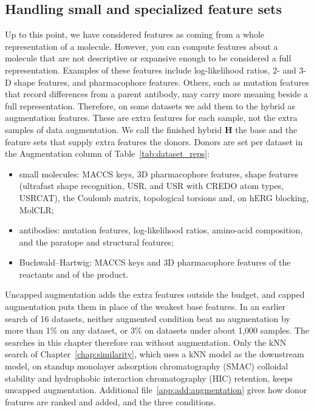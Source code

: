 \subsection{Handling small and specialized feature sets}\label{sec:method:augmentation}

Up to this point, we have considered features as coming from a whole representation of a molecule. However, you can compute features about a molecule that are not descriptive or expansive enough to be considered a full representation. Examples of these features include log-likelihood ratios, 2- and 3-D shape features, and pharmacophore features. Others, such as mutation features that record differences from a parent antibody, may carry more meaning beside a full representation. Therefore, on some datasets we add them to the hybrid as augmentation features. These are extra features for each sample, not the extra samples of data augmentation. We call the finished hybrid $\mathbf{H}$ the base and the feature sets that supply extra features the donors. Donors are set per dataset in the Augmentation column of Table~\ref{tab:dataset_reps}:
\begin{itemize}
    \item small molecules: MACCS keys, 3D pharmacophore features, shape features (ultrafast shape recognition, USR, and USR with CREDO atom types, USRCAT), the Coulomb matrix, topological torsions and, on hERG blocking, MolCLR;
    \item antibodies: mutation features, log-likelihood ratios, amino-acid composition, and the paratope and structural features;
    \item Buchwald--Hartwig: MACCS keys and 3D pharmacophore features of the reactants and of the product.
\end{itemize}
Uncapped augmentation adds the extra features outside the budget, and capped augmentation puts them in place of the weakest base features. In an earlier search of 16 datasets, neither augmented condition beat no augmentation by more than 1\% on any dataset, or 3\% on datasets under about 1,000 samples. The searches in this chapter therefore ran without augmentation. Only the kNN search of Chapter~\ref{chap:similarity}, which uses a kNN model as the downstream model, on standup monolayer adsorption chromatography (SMAC) colloidal stability and hydrophobic interaction chromatography (HIC) retention, keeps uncapped augmentation. Additional file~\ref{app:add:augmentation} gives how donor features are ranked and added, and the three conditions.


